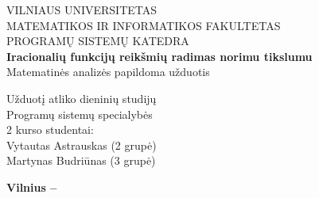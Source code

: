 \begin{titlepage}
  
  \begin{center}

    \uppercase{\Large Vilniaus universitetas\\
    Matematikos ir informatikos fakultetas\\
    Programų sistemų katedra}\\[7.0cm]

    \textbf{\LARGE Iracionalių funkcijų reikšmių radimas 
    norimu tikslumu}\\
    {\large Matematinės analizės papildoma užduotis}\\[4.0cm]

    \begin{minipage}[]{0.8\textwidth}
      \begin{flushright}
    {\large 
    Užduotį atliko dieninių studijų\\
    Programų sistemų specialybės\\
    2 kurso studentai:\\
    Vytautas Astrauskas (2 grupė)\\
    Martynas Budriūnas (3 grupė)}
      \end{flushright}
    \end{minipage}

    \vfill

    \textbf{\large Vilnius – \the\year}

  \end{center}

\end{titlepage}
